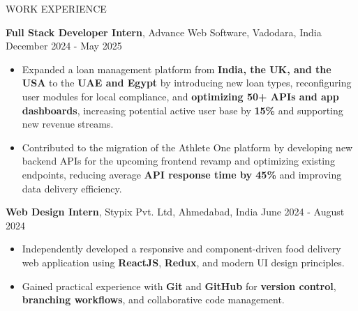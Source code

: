 \documentclass{resume} %
\begin{document}
\begin{rSection}{WORK EXPERIENCE}

\textbf{Full Stack Developer Intern}, Advance Web Software, Vadodara, India \hfill December 2024 - May 2025
\hfill 
 \begin{itemize}
    \itemsep -3pt {}
    \vspace{-0.5em}
     \item Expanded a loan management platform from \textbf{India, the UK, and the USA} to the \textbf{UAE and Egypt} by introducing new loan types, reconfiguring user modules for local compliance, and \textbf{optimizing 50+ APIs and app dashboards}, 
increasing potential active user base by \textbf{15\%} and supporting new revenue streams.
     \vspace{-0.25em}
     \item Contributed to the migration of the Athlete One platform by developing new backend APIs for the upcoming frontend revamp and optimizing existing endpoints, reducing average \textbf{API response time by 45\%} and improving 
data delivery efficiency.
     
 \end{itemize}

 \textbf{Web Design Intern}, Stypix Pvt. Ltd, Ahmedabad, India \hfill June 2024 - August 2024
 \begin{itemize}
    \itemsep -3pt {}
    \vspace{-0.5em}
     \item Independently developed a responsive and component-driven food delivery web application using \textbf{ReactJS}, \textbf{Redux}, and modern UI design principles.
\vspace{-0.5em}
\item Gained practical experience with \textbf{Git} and \textbf{GitHub} for \textbf{version control}, \textbf{branching workflows}, and collaborative code management.

     \vspace{-0.25em}
 \end{itemize}
 
  \vspace{-0.55em}


\end{rSection}
\end{document}
